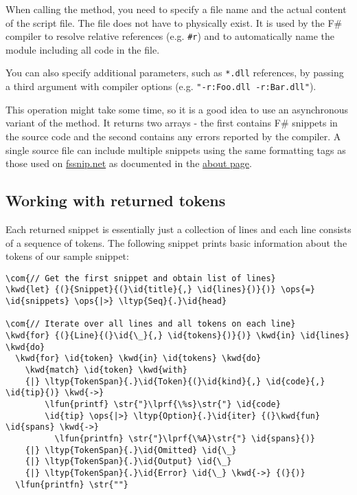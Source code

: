 \documentclass{article}
\newcommand{\id}[1]{\textcolor{black}{#1}}
\newcommand{\com}[1]{\textcolor{officegreen}{#1}}
\newcommand{\kwd}[1]{\textcolor{navy}{#1}}
\newcommand{\ops}[1]{\textcolor{purple}{#1}}
\newcommand{\str}[1]{\textcolor{olive}{#1}}
\begin{document}
When calling the method, you need to specify a file name and the actual content
of the script file. The file does not have to physically exist. It is used by the
F\# compiler to resolve relative references (e.g. \texttt{\#r}) and to automatically name
the module including all code in the file.


You can also specify additional parameters, such as \texttt{*.dll} references, by passing
a third argument with compiler options (e.g. \texttt{"-r:Foo.dll -r:Bar.dll"}).


This operation might take some time, so it is a good idea to use an asynchronous
variant of the method. It returns two arrays - the first contains F\# snippets
in the source code and the second contains any errors reported by the compiler.
A single source file can include multiple snippets using the same formatting tags
as those used on \href{http://www.fssnip.net}{fssnip.net} as documented in the
\href{http://www.fssnip.net/pages/About}{about page}.
\subsection*{Working with returned tokens}



Each returned snippet is essentially just a collection of lines and each line
consists of a sequence of tokens. The following snippet prints basic information
about the tokens of our sample snippet:
\begin{Verbatim}[commandchars=\\\{\}]
\com{// Get the first snippet and obtain list of lines}
\kwd{let} {(}{Snippet}{(}\id{title}{,} \id{lines}{)}{)} \ops{=} \id{snippets} \ops{|>} \ltyp{Seq}{.}\id{head}

\com{// Iterate over all lines and all tokens on each line}
\kwd{for} {(}{Line}{(}\id{\_}{,} \id{tokens}{)}{)} \kwd{in} \id{lines} \kwd{do}
  \kwd{for} \id{token} \kwd{in} \id{tokens} \kwd{do}
    \kwd{match} \id{token} \kwd{with}
    {|} \ltyp{TokenSpan}{.}\id{Token}{(}\id{kind}{,} \id{code}{,} \id{tip}{)} \kwd{->} 
        \lfun{printf} \str{"}\lprf{\%s}\str{"} \id{code}
        \id{tip} \ops{|>} \ltyp{Option}{.}\id{iter} {(}\kwd{fun} \id{spans} \kwd{->}
          \lfun{printfn} \str{"}\lprf{\%A}\str{"} \id{spans}{)}          
    {|} \ltyp{TokenSpan}{.}\id{Omitted} \id{\_} 
    {|} \ltyp{TokenSpan}{.}\id{Output} \id{\_} 
    {|} \ltyp{TokenSpan}{.}\id{Error} \id{\_} \kwd{->} {(}{)}
  \lfun{printfn} \str{""}
\end{Verbatim}
\end{document}

